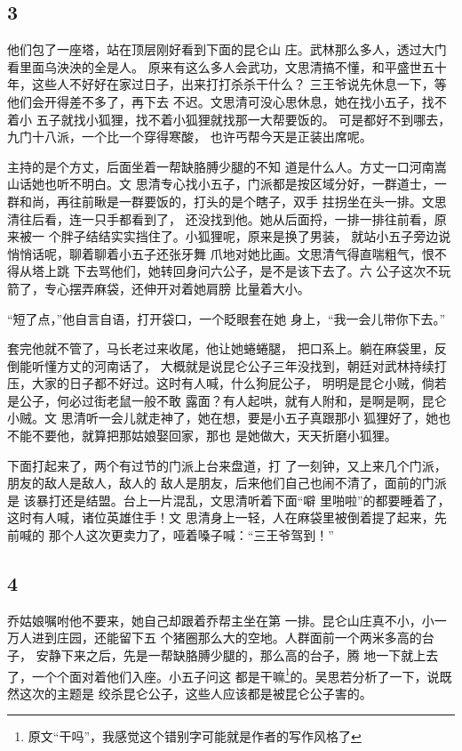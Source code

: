 {\centering\subsection{3}}

他们包了一座塔，站在顶层刚好看到下面的昆仑山
庄。武林那么多人，透过大门看里面乌泱泱的全是人。
原来有这么多人会武功，文思清搞不懂，和平盛世五十
年，这些人不好好在家过日子，出来打打杀杀干什么？
三王爷说先休息一下，等他们会开得差不多了，再下去
不迟。文思清可没心思休息，她在找小五子，找不着小
五子就找小狐狸，找不着小狐狸就找那一大帮要饭的。
可是都好不到哪去，九门十八派，一个比一个穿得寒酸，
也许丐帮今天是正装出席呢。

主持的是个方丈，后面坐着一帮缺胳膊少腿的不知
道是什么人。方丈一口河南嵩山话她也听不明白。文
思清专心找小五子，门派都是按区域分好，一群道士，一
群和尚，再往前瞅是一群要饭的，打头的是个瞎子，双手
拄拐坐在头一排。文思清往后看，连一只手都看到了，
还没找到他。她从后面捋，一排一排往前看，原来被一
个胖子结结实实挡住了。小狐狸呢，原来是换了男装，
就站小五子旁边说悄悄话呢，聊着聊着小五子还张牙舞
爪地对她比画。文思清气得直喘粗气，恨不得从塔上跳
下去骂他们，她转回身问六公子，是不是该下去了。六
公子这次不玩箭了，专心摆弄麻袋，还伸开对着她肩膀
比量着大小。

“短了点，”他自言自语，打开袋口，一个眨眼套在她
身上，“我一会儿带你下去。”

套完他就不管了，马长老过来收尾，他让她蜷蜷腿，
把口系上。躺在麻袋里，反倒能听懂方丈的河南话了，
大概就是说昆仑公子三年没找到，朝廷对武林持续打
压，大家的日子都不好过。这时有人喊，什么狗屁公子，
明明是昆仑小贼，倘若是公子，何必过街老鼠一般不敢
露面？有人起哄，就有人附和，是啊是啊，昆仑小贼。文
思清听一会儿就走神了，她在想，要是小五子真跟那小
狐狸好了，她也不能不要他，就算把那姑娘娶回家，那也
是她做大，天天折磨小狐狸。

下面打起来了，两个有过节的门派上台来盘道，打
了一刻钟，又上来几个门派，朋友的敌人是敌人，敌人的
敌人是朋友，后来他们自己也闹不清了，面前的门派是
该暴打还是结盟。台上一片混乱，文思清听着下面“噼
里啪啦”的都要睡着了，这时有人喊，诸位英雄住手！文
思清身上一轻，人在麻袋里被倒着提了起来，先前喊的
那个人这次更卖力了，哑着嗓子喊：“三王爷驾到！”
\newline

{\centering\subsection{4}}

乔姑娘嘱咐他不要来，她自己却跟着乔帮主坐在第
一排。昆仑山庄真不小，小一万人进到庄园，还能留下五
个猪圈那么大的空地。人群面前一个两米多高的台子，
安静下来之后，先是一帮缺胳膊少腿的，那么高的台子，腾
地一下就上去了，一个个面对着他们入座。小五子问这
都是干嘛\footnote{原文“干吗”，我感觉这个错别字可能就是作者的写作风格了}的。吴思若分析了一下，说既然这次的主题是
绞杀昆仑公子，这些人应该都是被昆仑公子害的。


